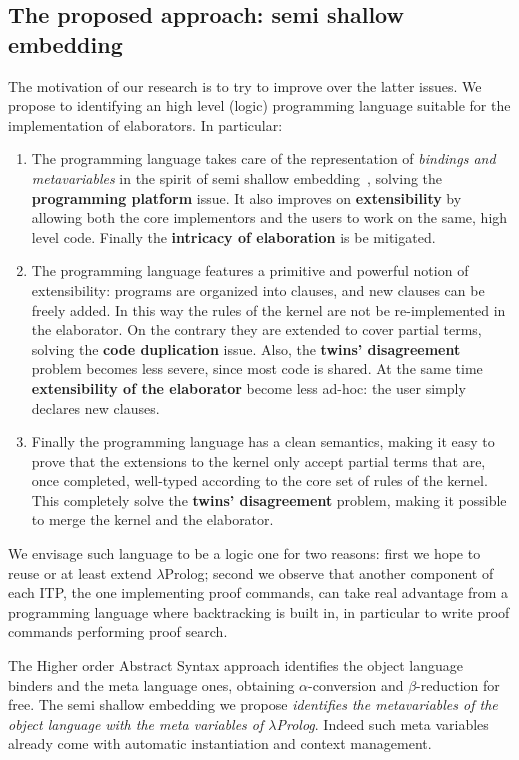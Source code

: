 \documentclass{easychair}
\begin{document}
\subsection{The proposed approach: semi shallow embedding}

The motivation of our research is to try to improve over the latter issues.  We
propose to identifying an high level (logic) programming language suitable for
the implementation of elaborators. In particular:
\begin{enumerate}
\item The programming language takes care of the representation of
	\emph{bindings and metavariables} in the spirit of semi
	shallow embedding~\cite{Dunchev:2016:IHH:2966268.2966272},
	solving the \textbf{programming platform} issue.
	It also improves on \textbf{extensibility} by allowing
	both the core implementors and the users to work on the same,
	high level code.
	Finally the \textbf{intricacy of elaboration} is be mitigated.
\item The programming language features a primitive and powerful
	notion of extensibility: programs are organized into clauses,
	and new clauses can be freely added.
	In this way the rules of the kernel are not be re-implemented in the
	elaborator. On the contrary they are extended to cover partial terms,
	solving the \textbf{code duplication} issue.
	Also, the \textbf{twins' disagreement} problem becomes less severe,
	since most code is shared.
	At the same time \textbf{extensibility of the elaborator}
	become less ad-hoc: the user simply declares new clauses.
\item Finally the programming language has a clean semantics, making it
	easy to prove that the extensions to the kernel
	only accept partial terms that are, once completed,
	well-typed according
	to the core set of rules of the kernel.  This completely
	solve the \textbf{twins' disagreement} problem, making it possible to
	merge the kernel and the elaborator.
\end{enumerate}

We envisage such language to be a logic one for two reasons:
first we hope to reuse or at least extend $\lambda$Prolog;
second we observe that another component of each ITP, the one
implementing proof commands, can take real advantage from a 
programming language where backtracking is built in, in
particular to write proof commands performing proof search.

The Higher order Abstract Syntax approach identifies the object
language binders and the meta language ones, obtaining $\alpha$-conversion
and $\beta$-reduction for free.  The semi shallow embedding we propose
\emph{identifies the metavariables of the object language with the 
meta variables of $\lambda$Prolog}.  Indeed such meta variables already
come with automatic instantiation and context management.
\end{document}
